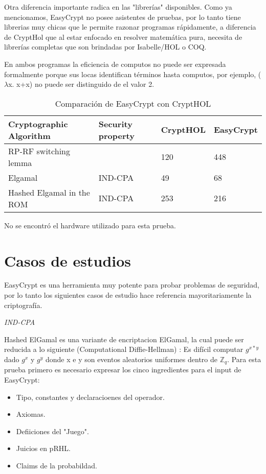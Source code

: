 \documentclass[runningheads,a4paper]{llncs}
\begin{document}
Otra diferencia importante radica en las "librerías" disponibles. Como ya mencionamos, EasyCrypt no posee asistentes de pruebas, por lo tanto tiene librerias muy chicas que le permite razonar programas rápidamente, a diferencia de CryptHol que al estar enfocado en resolver matemática pura, necesita de librerías completas que son brindadas por Isabelle/HOL o COQ.

En ambos programas la eficiencia de computos no puede ser expresada formalmente porque sus locas identifican términos hasta computos, por ejemplo, ($\lambda$x. x+x) no puede ser distinguido de el valor 2.\cite{article6}

\begin{table}
  \caption{Comparación de EasyCrypt con CryptHOL}
  \label{tab:simple2}
  \centering
  \begin{tabular}{ |p{4cm}|p{1.5cm}|p{1.5cm}|p{1.5cm}|  }
 \hline
 Cryptographic Algorithm & Security property & CryptHOL & EasyCrypt\\\cline{1-4}
 \hline
 RP-RF switching lemma &  & 120 & 448\\
 Elgamal & IND-CPA & 49  & 68\\
 Hashed Elgamal in the ROM & IND-CPA & 253 &  216\\
 \hline
\end{tabular}
\end{table}


No se encontró el hardware utilizado para esta prueba.




\section{Casos de estudios}
EasyCrypt es una herramienta muy potente para probar problemas de seguridad, por lo tanto los siguientes casos de estudio hace referencia mayoritariamente la criptografía.

\centerline{\emph{IND-CPA}}

Hashed ElGamal es una variante de encriptacion ElGamal, la cual puede ser reducida a lo siguiente (Computational Diffie-Hellman) : Es difícil computar $g^{x*y}$ dado $g^x$ y $g^y$ donde x e y son eventos aleatorios uniformes dentro de $\mathbb{Z}_q$.
Para esta prueba primero es necesario expresar los cinco ingredientes para el input de EasyCrypt:
\begin{itemize}
	\item Tipo, constantes y declaracioenes del operador.
	\item Axiomas.
	\item Defiiciones del "Juego".
	\item Juicios en pRHL.
	\item Claims de la probabildad.
\end{itemize}
\end{document}
